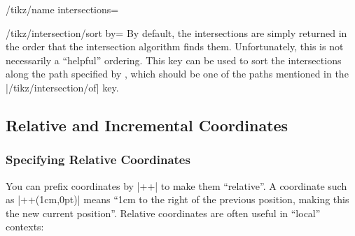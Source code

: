 \begin{key}{/tikz/name intersections=}
    \begin{key}{/tikz/intersection/sort by=}
        By default, the intersections are simply returned in the order that the
        intersection algorithm finds them. Unfortunately, this is not
        necessarily a ``helpful'' ordering. This key can be used to sort the
        intersections along the path specified by , which
        should be one of the paths mentioned in the |/tikz/intersection/of|
        key.
\begin{codeexample}[preamble={\usetikzlibrary{intersections}}]
\end{codeexample}
    \end{key}
\end{key}


\subsection{Relative and Incremental Coordinates}

\subsubsection{Specifying Relative Coordinates}

You can prefix coordinates by |++| to make them ``relative''. A coordinate such
as |++(1cm,0pt)| means ``1cm to the right of the previous position, making this
the new current position''. Relative coordinates are often useful in ``local''
contexts:
%
\begin{codeexample}[]
\end{codeexample}

